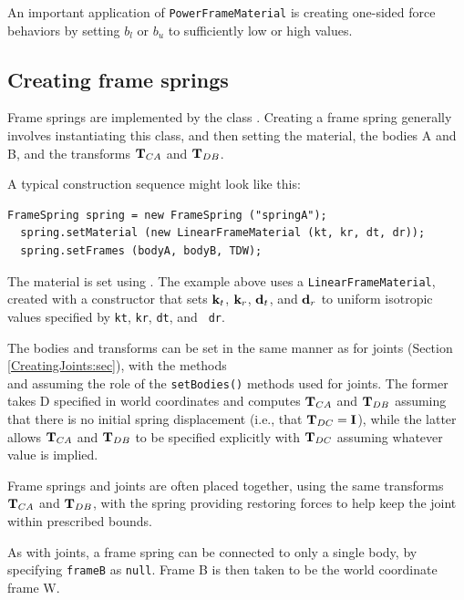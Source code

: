 An important application of {\tt PowerFrameMaterial} is creating one-sided
force behaviors by setting $b_l$ or $b_u$ to sufficiently low or high values.

\subsection{Creating frame springs}
\label{CreatingFrameSprings:sec}

Frame springs are implemented by the class
.  Creating a frame
spring generally involves instantiating this class, and then setting
the material, the bodies A and B, and the transforms ${\bf T}_{CA}$ and
${\bf T}_{DB}$.

A typical construction sequence might look like this:
%
\begin{lstlisting}[]
  FrameSpring spring = new FrameSpring ("springA");
  spring.setMaterial (new LinearFrameMaterial (kt, kr, dt, dr));
  spring.setFrames (bodyA, bodyB, TDW);
\end{lstlisting}
%
The material is set using
.
The example above uses a {\tt LinearFrameMaterial}, created with a
constructor that sets ${\bf k}_t$, ${\bf k}_r$, ${\bf d}_t$, and ${\bf d}_r$ to uniform
isotropic values specified by {\tt kt}, {\tt kr}, {\tt dt}, and {\tt
dr}. 

The bodies and transforms can be set in the same manner as for joints
(Section \ref{CreatingJoints:sec}), with the
methods\\ 
and
assuming the role of the {\tt setBodies()} methods used for joints.
The former takes D specified in world coordinates and computes
${\bf T}_{CA}$ and ${\bf T}_{DB}$ assuming that there is no initial spring
displacement (i.e., that ${\bf T}_{DC} = {\bf I}$), while the latter allows
${\bf T}_{CA}$ and ${\bf T}_{DB}$ to be specified explicitly with ${\bf T}_{DC}$
assuming whatever value is implied.

Frame springs and joints are often placed together, using the same
transforms ${\bf T}_{CA}$ and ${\bf T}_{DB}$, with the spring providing
restoring forces to help keep the joint within prescribed bounds.

As with joints, a frame spring can be connected to only a single body,
by specifying {\tt frameB} as {\tt null}. Frame B is then taken to be
the world coordinate frame W.

